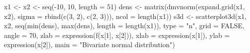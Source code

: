 \begin{Schunk}
\begin{Sinput}
 x1 <- x2 <- seq(-10, 10, length = 51) 
 dens <- matrix(dmvnorm(expand.grid(x1, x2), sigma = rbind(c(3, 2), c(2, 3))), ncol = length(x1)) 
 s3d <- scatterplot3d(x1, x2, seq(min(dens), max(dens), length = length(x1)), type = "n", grid = FALSE, angle = 70, zlab = expression(f(x[1], x[2])), xlab = expression(x[1]), ylab = expression(x[2]), main = "Bivariate normal distribution")
\end{Sinput}
\end{Schunk}
